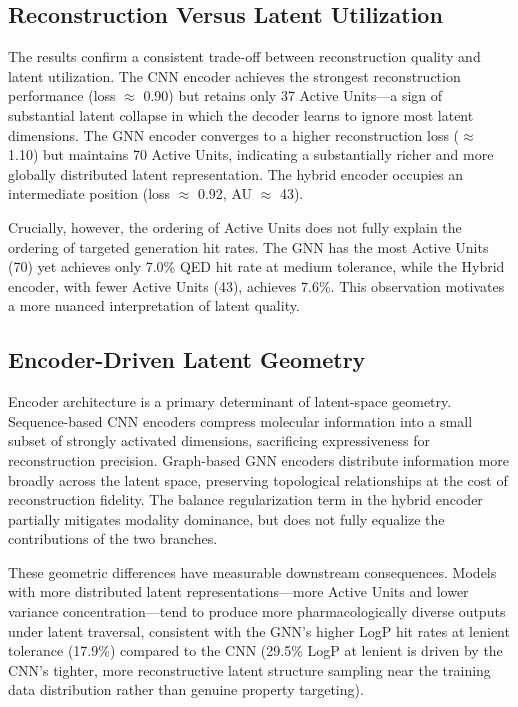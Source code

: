 \documentclass[conference]{IEEEtran}
\begin{document}
\subsection{Reconstruction Versus Latent Utilization}

The results confirm a consistent trade-off between reconstruction quality and latent utilization. The CNN encoder achieves the strongest reconstruction performance (loss $\approx$ 0.90) but retains only 37 Active Units---a sign of substantial latent collapse in which the decoder learns to ignore most latent dimensions. The GNN encoder converges to a higher reconstruction loss ($\approx$ 1.10) but maintains 70 Active Units, indicating a substantially richer and more globally distributed latent representation. The hybrid encoder occupies an intermediate position (loss $\approx$ 0.92, AU $\approx$ 43).

Crucially, however, the ordering of Active Units does not fully explain the ordering of targeted generation hit rates. The GNN has the most Active Units (70) yet achieves only 7.0\% QED hit rate at medium tolerance, while the Hybrid encoder, with fewer Active Units (43), achieves 7.6\%. This observation motivates a more nuanced interpretation of latent quality.

\subsection{Encoder-Driven Latent Geometry}

Encoder architecture is a primary determinant of latent-space geometry. Sequence-based CNN encoders compress molecular information into a small subset of strongly activated dimensions, sacrificing expressiveness for reconstruction precision. Graph-based GNN encoders distribute information more broadly across the latent space, preserving topological relationships at the cost of reconstruction fidelity. The balance regularization term in the hybrid encoder partially mitigates modality dominance, but does not fully equalize the contributions of the two branches.

These geometric differences have measurable downstream consequences. Models with more distributed latent representations---more Active Units and lower variance concentration---tend to produce more pharmacologically diverse outputs under latent traversal, consistent with the GNN's higher LogP hit rates at lenient tolerance (17.9\%) compared to the CNN (29.5\% LogP at lenient is driven by the CNN's tighter, more reconstructive latent structure sampling near the training data distribution rather than genuine property targeting).
\end{document}
